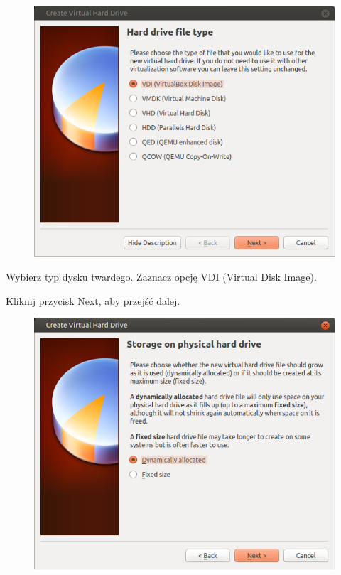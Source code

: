 \begin{figure}
	\vspace{-10pt}
	\includegraphics[width=\linewidth]{images/virtualbox_wizard4.png}
\end{figure}

Wybierz typ dysku twardego. Zaznacz opcję \textcolor{ubuntu_orange}{VDI (Virtual Disk Image)}.
\begin{flushright}
Kliknij przycisk \textcolor{ubuntu_orange}{Next}, aby przejść dalej.
\end{flushright}

\clearpage
\begin{figure}
	\vspace{-10pt}
	\includegraphics[width=\linewidth]{images/virtualbox_wizard5.png}
\end{figure}

